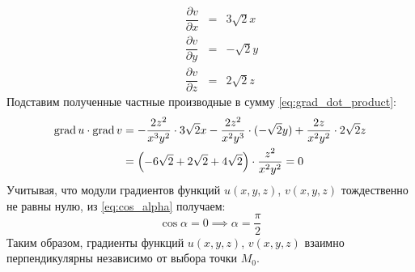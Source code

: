 \begin{solution}
\[  \quad\quad
  \begin{array}{rcl}
  \dfrac{\partial v}{\partial x} & = & 3\sqrt{2}x \\[2ex]
  \dfrac{\partial v}{\partial y} & = & -\sqrt{2}y \\[2ex]
  \dfrac{\partial v}{\partial z} & = & 2\sqrt{2}z
  \end{array}
  \]
  Подставим полученные частные производные в сумму \eqref{eq:grad_dot_product}:
  \[
  \begin{aligned}
  \textrm{grad}\, u\cdot\textrm{grad}\, v &= -\dfrac{2z^2}{x^3y^2}\cdot 3\sqrt{2}x
                        -\dfrac{2z^2}{x^2y^3}\cdot(-\sqrt{2}y)
                        +\dfrac{2z}{x^2y^2}\cdot 2\sqrt{2}z \\
                      &= \left(-6\sqrt{2}+2\sqrt{2}+4\sqrt{2}\right)\cdot\dfrac{z^2}{x^2y^2} = 0
  \end{aligned}
  \]
  Учитывая, что модули градиентов функций \( u(x,y,z) \), \( v(x,y,z) \) тождественно не равны нулю, из \eqref{eq:cos_alpha} получаем:
  \[ \cos\alpha=0\implies\alpha=\dfrac{\pi}{2} \]
  Таким образом, градиенты функций \( u(x,y,z) \), \( v(x,y,z) \) взаимно перпендикулярны независимо от выбора точки \( M_0 \).
\end{solution}